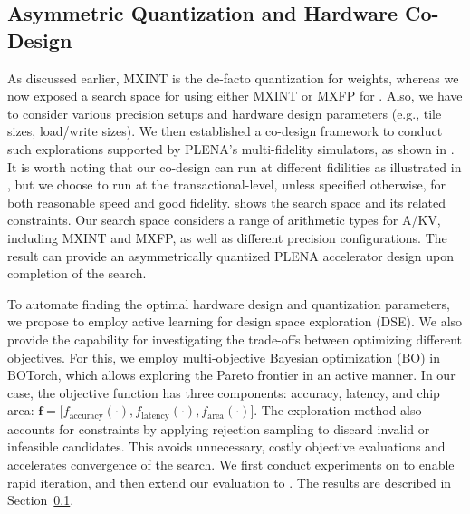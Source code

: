 \subsection{Asymmetric Quantization and Hardware Co-Design}
\label{subsec:co_design}

As discussed earlier, MXINT is the de-facto quantization for weights, whereas we now exposed a search space for using either MXINT or MXFP for . Also, we have to consider various precision setups and hardware design parameters (e.g., tile sizes, load/write sizes). 
We then established a co-design framework to conduct such explorations supported by PLENA's multi-fidelity simulators, as shown in . 
It is worth noting that our co-design can run at different fidilities as illustrated in , but we choose to run at the transactional-level, unless specified otherwise, for both reasonable speed and good fidelity.
 shows the search space and its related constraints. Our search space considers a range of arithmetic types for A/KV, including MXINT and MXFP, as well as different precision configurations. The result can provide an asymmetrically quantized PLENA accelerator design upon completion of the search.

To automate finding the optimal hardware design and quantization parameters, we propose to employ active learning for design space exploration (DSE). We also provide the capability for investigating the trade-offs between optimizing different objectives. For this, we employ multi-objective Bayesian optimization (BO) in BOTorch, which allows exploring the Pareto frontier in an active manner. In our case, the objective function has three components: accuracy, latency, and chip area: $\mathbf{f} = \big[ f_\text{accuracy}(\cdot), f_\text{latency}(\cdot), f_\text{area}(\cdot) \big]$. The exploration method also accounts for constraints by applying rejection sampling to discard invalid or infeasible candidates. This avoids unnecessary, costly objective evaluations and accelerates convergence of the search.
We first conduct experiments on \llamaTiny{} to enable rapid iteration, and then extend our evaluation to \llamaIIISmall{}. 
The results are described in Section~\ref{subsec:co_design}.



